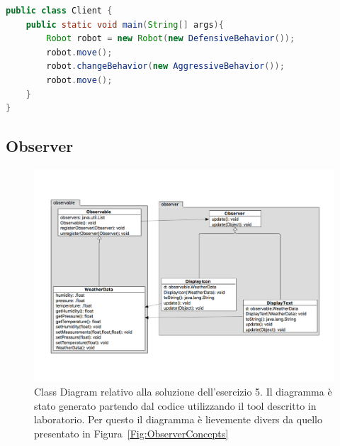 \documentclass{article}
\begin{document}
\begin{lstlisting}[language=Java]
public class Client {
	public static void main(String[] args){
		Robot robot = new Robot(new DefensiveBehavior());
		robot.move();
		robot.changeBehavior(new AggressiveBehavior());
		robot.move();
	}
}
\end{lstlisting}

\subsection{Observer}


\begin{figure}[h]
\includegraphics[width=1\textwidth]{Img/ObserverEsercizio5.pdf}
\caption{Class Diagram relativo alla soluzione dell'esercizio 5. Il diagramma \`e stato generato partendo dal codice utilizzando il tool descritto in laboratorio. Per questo il diagramma \`e lievemente divers da quello presentato in Figura~\ref{Fig:ObserverConcepts}}
\label{Fig:observerImpl1}
\end{figure}
\end{document}
